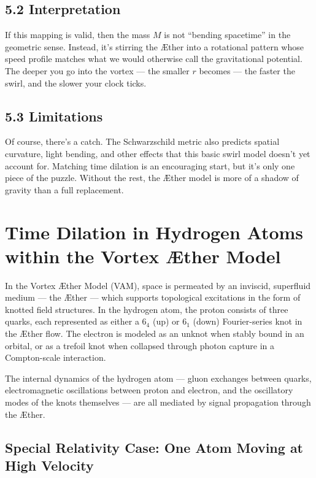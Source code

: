 \documentclass[11pt]{article}
\begin{document}
\subsection*{5.2 Interpretation}

If this mapping is valid, then the mass $M$ is not “bending spacetime” in the geometric sense. Instead, it’s stirring the Æther into a rotational pattern whose speed profile matches what we would otherwise call the gravitational potential. The deeper you go into the vortex — the smaller $r$ becomes — the faster the swirl, and the slower your clock ticks.

\subsection*{5.3 Limitations}

Of course, there’s a catch. The Schwarzschild metric also predicts spatial curvature, light bending, and other effects that this basic swirl model doesn’t yet account for. Matching time dilation is an encouraging start, but it’s only one piece of the puzzle. Without the rest, the Æther model is more of a shadow of gravity than a full replacement.

\section{Time Dilation in Hydrogen Atoms within the Vortex Æther Model}

In the Vortex Æther Model (VAM), space is permeated by an inviscid, superfluid medium --- the Æther --- which supports topological excitations in the form of knotted field structures. In the hydrogen atom, the proton consists of three quarks, each represented as either a $6_4$ (up) or $6_1$ (down) Fourier-series knot in the Æther flow. The electron is modeled as an unknot when stably bound in an orbital, or as a trefoil knot when collapsed through photon capture in a Compton-scale interaction.

The internal dynamics of the hydrogen atom --- gluon exchanges between quarks, electromagnetic oscillations between proton and electron, and the oscillatory modes of the knots themselves --- are all mediated by signal propagation through the Æther.

\subsection{Special Relativity Case: One Atom Moving at High Velocity}
\end{document}
